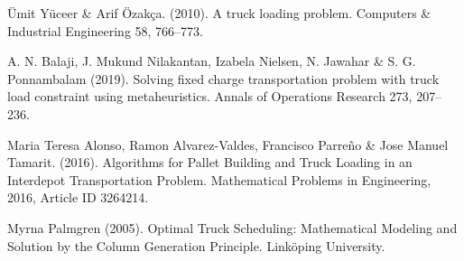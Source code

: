 \documentclass{article}
\begin{document}
\begin{thebibliography}{1}

Ümit Yüceer \& Arif Özakça. (2010). 
\newblock A truck loading problem. Computers \& Industrial Engineering 58, 766–773.

A. N. Balaji, J. Mukund Nilakantan, Izabela Nielsen, N. Jawahar \& S. G. Ponnambalam (2019).
\newblock Solving fixed charge transportation problem with truck load constraint using metaheuristics. Annals of Operations Research 273, 207–236.

Maria Teresa Alonso, Ramon Alvarez-Valdes, Francisco Parreño \& Jose Manuel Tamarit. (2016).
\newblock Algorithms for Pallet Building and Truck Loading in an Interdepot Transportation Problem. Mathematical Problems in Engineering, 2016, Article ID 3264214.

Myrna Palmgren (2005).
\newblock Optimal Truck Scheduling: Mathematical Modeling and Solution by the Column Generation Principle. Linköping University.

\end{thebibliography}
\end{document}
